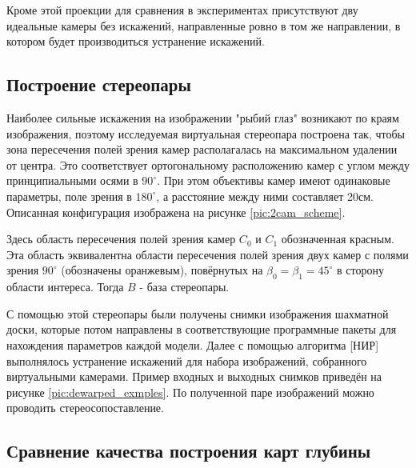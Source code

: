 Кроме этой проекции для сравнения в экспериментах присутствуют дву идеальные камеры без искажений, направленные
ровно в том же направлении, в котором будет производиться устранение  искажений.  


\subsection{Построение стереопары}

Наиболее сильные искажения на изображении "рыбий глаз" возникают по краям изображения, поэтому исследуемая виртуальная стереопара построена так,
чтобы зона пересечения полей зрения камер располагалась на максимальном удалении от центра. Это соответствует ортогональному расположению
камер с углом между принципиальными осями в $90^\circ$.  При этом объективы камер имеют одинаковые параметры, поле зрения в $180^\circ$,
 а расстояние между ними составляет 20см. Описанная конфигурация изображена на рисунке \ref{pic:2cam_scheme}.

Здесь область пересечения полей зрения камер $C_0$ и $C_1$ обозначенная красным.
Эта область эквивалентна области пересечения полей зрения двух камер с полями зрения $90^\circ$ (обозначены
оранжевым), повёрнутых на $\beta_0 = \beta_1  = 45^\circ$ в сторону области интереса. Тогда $B$ - база стереопары.

С помощью этой стереопары были получены снимки изображения шахматной доски, 
которые потом  направлены в соответствующие программные пакеты для нахождения параметров каждой модели. Далее с помощью алгоритма [НИР]				%
выполнялось устранение искажений для набора изображений, собранного виртуальными камерами. Пример входных и выходных снимков приведён на
рисунке \ref{pic:dewarped_exmples}.  По полученной паре изображений можно проводить стереосопоставление.



\subsection{Сравнение качества построения карт глубины}

